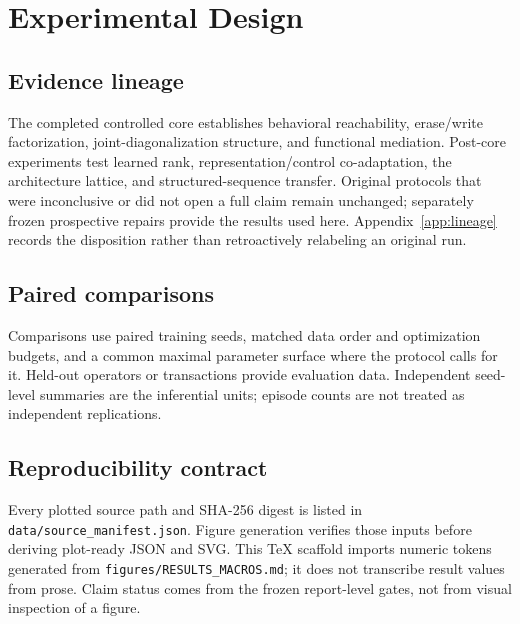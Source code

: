 \section{Experimental Design}
\label{sec:design}

\subsection{Evidence lineage}

The completed controlled core establishes behavioral reachability,
erase/write factorization, joint-diagonalization structure, and functional
mediation.  Post-core experiments test learned rank, representation/control
co-adaptation, the architecture lattice, and structured-sequence transfer.
Original protocols that were inconclusive or did not open a full claim remain
unchanged; separately frozen prospective repairs provide the results used
here.  Appendix~\ref{app:lineage} records the disposition rather than
retroactively relabeling an original run.

\subsection{Paired comparisons}

Comparisons use paired training seeds, matched data order and optimization
budgets, and a common maximal parameter surface where the protocol calls for
it.  Held-out operators or transactions provide evaluation data.  Independent
seed-level summaries are the inferential units; episode counts are not treated
as independent replications.

\subsection{Reproducibility contract}

Every plotted source path and SHA-256 digest is listed in
\texttt{data/source\_manifest.json}.  Figure generation verifies those inputs
before deriving plot-ready JSON and SVG.  This TeX scaffold imports numeric
tokens generated from \texttt{figures/RESULTS\_MACROS.md}; it does not
transcribe result values from prose.  Claim status comes from the frozen
report-level gates, not from visual inspection of a figure.
